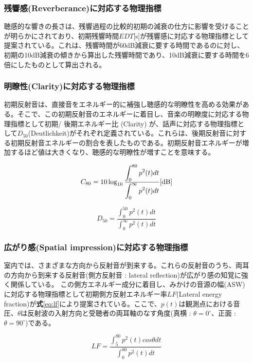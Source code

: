\subsubsection{残響感(Reverberance)に対応する物理指標}
聴感的な響きの長さは、残響過程の比較的初期の減衰の仕方に影響を受けることが明らかにされており、初期残響時間$EDT$[s]が残響感に対応する物理指標として提案されている。これは、残響時間が60dB減衰に要する時間であるのに対し、初期の10dB減衰の傾きから算出した残響時間であり、10dB減衰に要する時間を6倍にしたものとして算出される。

\subsubsection{明瞭性(Clarity)に対応する物理指標}
初期反射音は、直接音をエネルギー的に補強し聴感的な明瞭性を高める効果がある。そこで、この初期反射音のエネルギーに着目し、音楽の明瞭度に対応する物理指標として初期/ 後期エネルギー比 \Clarity(Clarity) が、話声に対応する物理指標として$D_{50}$(Deutlichkeit)がそれぞれ定義されている。これらは、後期反射音に対する初期反射音エネルギーの割合を表したものである。初期反射音エネルギーが増加するほど値は大きくなり、聴感的な明瞭性が増すことを意味する。

\begin{equation}
    \label{eq:c80}
  C_{80} = 10\log_{10}{\frac{\displaystyle\int_0^{80}p^2(t)dt}{\displaystyle\int_0^{\infty}p^2(t)dt}} \textrm{[dB]}
\end{equation}

\begin{equation}
    \label{eq:c80}
  D_{50} = {\frac{\displaystyle\int_0^{50}p^2(t)dt}{\displaystyle\int_0^{\infty}p^2(t)dt}} 
\end{equation}

\subsubsection{広がり感(Spatial impression)に対応する物理指標}
室内では、さまざまな方向から反射音が到来する。これらの反射音のうち、両耳の方向から到来する反射音(側方反射音 : lateral reflection)が広がり感の知覚に強く関係している。
この側方エネルギー成分に着目し、みかけの音源の幅(ASW)に対応する物理指標として初期側方反射エネルギー率$LF$(Lateral energy fraction)が\textbf{式}\ref{eq:lf}により提案されている。ここで、$p(t)$は観測点における音圧、$\theta$は反射波の入射方向と受聴者の両耳軸のなす角度(真横 : $\theta = 0^\circ$、正面 : $\theta = 90^\circ$)である。

\begin{equation}
    \label{eq:lf}
  LF = \frac{\displaystyle\int_5^{80}p^2(t)cos{\theta}dt}{\displaystyle\int_0^{80}p^2(t)dt} 
\end{equation}



